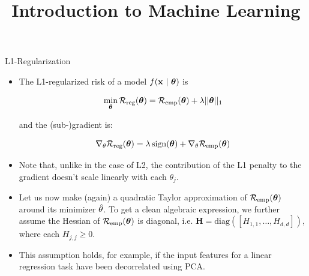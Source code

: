 



\newcommand{\titlefigure}{figure/l1_reg_hess_01.png}
\newcommand{\learninggoals}{
  \item Have a geometric understanding of L1-regularization
  \item Understand geometrically how L1-regularization induces sparsity
}

\title{Introduction to Machine Learning}
\date{}




\begin{vbframe} {L1-Regularization}
  

  \begin{itemize}
    \item The L1-regularized risk of a model $f(\mathbf{x} ~|~ \bm{\theta})$ is

      \[
      \min_{\bm{\theta}} \mathcal{R}_{\text{reg}}(\bm{\theta}) = \mathcal{R}_{\text{emp}}(\bm{\theta}) + \lambda ||\bm{\theta}||_1
      \] 
      
      and the (sub-)gradient is:
      
      $$\nabla_{\theta} \mathcal{R}_{\text{reg}}(\bm{\theta}) = \lambda \operatorname{sign}(\bm{\theta}) + \nabla_{\theta} \mathcal{R}_{\text{emp}}(\bm{\theta})$$

    \item Note that, unlike in the case of L2, the contribution of the L1 penalty to the gradient doesn't scale linearly with each $\theta_j$. 
    \item Let us now make (again) a quadratic Taylor approximation of $\mathcal{R}_{\text{emp}}(\bm{\theta})$ around its minimizer $\hat{\theta}$. To get a clean algebraic expression, we further assume the Hessian of $\mathcal{R}_{\text{emp}}(\bm{\theta})$ is diagonal, i.e. $\bm{H} = \text{diag}([H_{1,1}, \ldots , H_{d,d}])$, where each $H_{j,j} \geq 0$.
    \item This assumption holds, for example, if the input features for a linear regression task have been decorrelated using PCA.
  \end{itemize}
  
  \framebreak
  

\end{vbframe}
